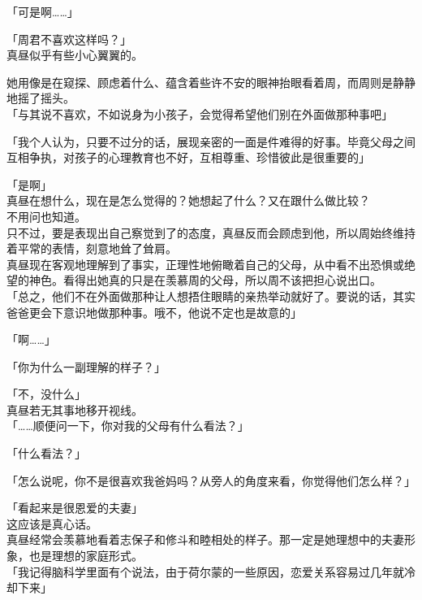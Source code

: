 「可是啊……」

「周君不喜欢这样吗？」\\

真昼似乎有些小心翼翼的。

她用像是在窥探、顾虑着什么、蕴含着些许不安的眼神抬眼看着周，而周则是静静地摇了摇头。\\

「与其说不喜欢，不如说身为小孩子，会觉得希望他们别在外面做那种事吧」

「我个人认为，只要不过分的话，展现亲密的一面是件难得的好事。毕竟父母之间互相争执，对孩子的心理教育也不好，互相尊重、珍惜彼此是很重要的」

「是啊」\\

真昼在想什么，现在是怎么觉得的？她想起了什么？又在跟什么做比较？\\

不用问也知道。\\

只不过，要是表现出自己察觉到了的态度，真昼反而会顾虑到他，所以周始终维持着平常的表情，刻意地耸了耸肩。\\

真昼现在客观地理解到了事实，正理性地俯瞰着自己的父母，从中看不出恐惧或绝望的神色。看得出她真的只是在羡慕周的父母，所以周不该把担心说出口。\\

「总之，他们不在外面做那种让人想捂住眼睛的亲热举动就好了。要说的话，其实爸爸更会下意识地做那种事。哦不，他说不定也是故意的」

「啊……」

「你为什么一副理解的样子？」

「不，没什么」\\

真昼若无其事地移开视线。\\

「……顺便问一下，你对我的父母有什么看法？」

「什么看法？」

「怎么说呢，你不是很喜欢我爸妈吗？从旁人的角度来看，你觉得他们怎么样？」

「看起来是很恩爱的夫妻」\\

这应该是真心话。\\

真昼经常会羡慕地看着志保子和修斗和睦相处的样子。那一定是她理想中的夫妻形象，也是理想的家庭形式。\\

「我记得脑科学里面有个说法，由于荷尔蒙的一些原因，恋爱关系容易过几年就冷却下来」

